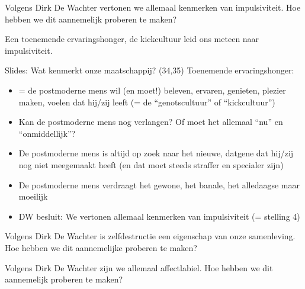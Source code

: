 \documentclass[main.tex]{subfiles}
\begin{document}
\begin{examenvraag}
    \begin{vraag}
        Volgens Dirk De Wachter vertonen we allemaal kenmerken van impulsiviteit. Hoe hebben we dit aannemelijk proberen te maken?
    \end{vraag}

    \begin{antwoord}
        Een toenemende ervaringshonger, de kickcultuur leid ons meteen naar impulsiviteit.
        \begin{citaat}{Slides: Wat kenmerkt onze maatschappij? (34,35)}
            Toenemende ervaringshonger:
            \begin{itemize}
                \item = de postmoderne mens wil (en moet!) beleven, ervaren, genieten, plezier maken, voelen dat hij/zij leeft (= de “genotscultuur” of “kickcultuur”)
                \item Kan de postmoderne mens nog verlangen? Of moet het allemaal “nu” en “onmiddellijk”?
                \item De postmoderne mens is altijd op zoek naar het nieuwe, datgene dat hij/zij nog niet meegemaakt heeft (en dat moet steeds straffer en specialer zijn)
                \item De postmoderne mens verdraagt het gewone, het banale, het alledaagse maar moeilijk
                \item DW besluit: We vertonen allemaal kenmerken van impulsiviteit (= stelling 4)
            \end{itemize}
        \end{citaat}
    \end{antwoord}
\end{examenvraag}


\begin{examenvraag}
    \begin{vraag}
        Volgens Dirk De Wachter is zelfdestructie een eigenschap van onze samenleving. Hoe hebben we dit aannemelijke proberen te maken?
    \end{vraag}

    \begin{antwoord}
    \end{antwoord}
\end{examenvraag}


\begin{examenvraag}
    \begin{vraag}
        Volgens Dirk De Wachter zijn we allemaal affectlabiel. Hoe hebben we dit aannemelijk proberen te maken?
    \end{vraag}

    \begin{antwoord}
    \end{antwoord}
\end{examenvraag}
\end{document}
